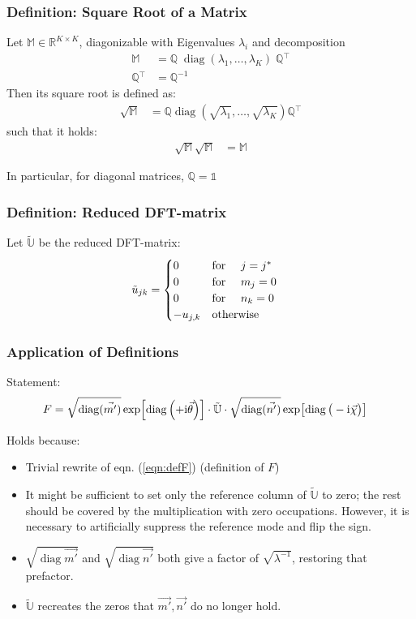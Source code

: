 \documentclass[
	english,
	a4paper,
	fontsize=10pt,
	parskip=half,
	titlepage=true,
	DIV=12,
	final
]{scrreprt}
\newcommand*{\transp}{\ensuremath{^\intercal}}
\newcommand*{\iunit}{\ensuremath{\mathrm{i}}}
\newcommand*{\setReals}    {\ensuremath{\mathbb{R}}}
\DeclareMathOperator{\diag}{diag}
\begin{document}
\subsubsection{Definition: Square Root of a Matrix}
Let $\mathbb{M} \in \setReals^{K \times K}$, diagonizable with Eigenvalues $\lambda_i$ and decomposition
\begin{align}
	\mathbb{M}
&=
	\mathbb{Q} \; \diag(\lambda_1, \ldots, \lambda_K) \; \mathbb{Q}\transp 
\\
	\mathbb{Q}\transp
&=
	\mathbb{Q}^{-1}
\end{align}
Then its square root is defined as:
\begin{align}
	\sqrt{\mathbb{M}}
&=
	\mathbb{Q} \diag(\sqrt{\lambda_1}, \ldots, \sqrt{\lambda_K}) \mathbb{Q}\transp 
\end{align}
such that it holds:
\begin{align}
	\sqrt{\mathbb{M}}  \sqrt{\mathbb{M}} &= \mathbb{M}
\end{align}

In particular, for diagonal matrices, $\mathbb{Q} = \mathds{1}$

\subsubsection{Definition: Reduced DFT-matrix}
Let $\tilde{\mathbb{U}}$ be the reduced DFT-matrix:
\begin{align}
	\tilde{u}_{jk}
&=
	\begin{cases}
		0			&\qq*{for } j = j^* \\
		0			&\qq*{for } m_j = 0 \\
		0			&\qq*{for } n_k = 0 \\
		-u_{j,k}		&\qotherwise*
	\end{cases}
\end{align}

\subsubsection{Application of Definitions}
Statement:
\begin{align}
	F
&=
		\sqrt{\diag(\vec{m'})}
		\exp [\diag\qty(+\iunit\vec{\theta})]
	\cdot
		\tilde{\mathbb{U}}
	\cdot
		\sqrt{\diag(\vec{n'})}
		\exp [\diag\qty(\big. -\iunit\vec{\chi})]
\end{align}

Holds because:
\begin{itemize}
\item Trivial rewrite of eqn. (\ref{eqn:defF}) (definition of $F$)
\item {\color{red} It might be sufficient to set only the reference column of $\tilde{\mathbb{U}}$ to zero; the rest should be covered by the multiplication with zero occupations. However, it is necessary to artificially suppress the reference mode and flip the sign.}
\item $\sqrt{\diag{\vec{m'}}}$ and $\sqrt{\diag{\vec{n'}}}$ both give a factor of $\sqrt{\lambda^{-1}}$, restoring that prefactor.
\item $\tilde{\mathbb{U}}$ recreates the zeros that $\vec{m'}, \vec{n'}$ do no longer hold.
\end{itemize}
\end{document}
